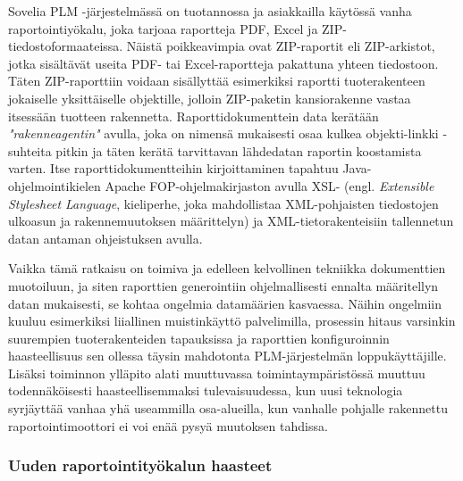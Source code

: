 Sovelia PLM -järjestelmässä on tuotannossa ja asiakkailla käytössä vanha raportointiyökalu, joka tarjoaa raportteja PDF, Excel ja ZIP-tiedostoformaateissa. Näistä poikkeavimpia ovat ZIP-raportit eli ZIP-arkistot,  jotka sisältävät useita PDF- tai Excel-raportteja pakattuna yhteen tiedostoon. Täten ZIP-raporttiin voidaan sisällyttää esimerkiksi raportti tuoterakenteen jokaiselle yksittäiselle objektille, jolloin ZIP-paketin kansiorakenne vastaa itsessään tuotteen rakennetta. Raporttidokumenttein data kerätään \textit{"rakenneagentin"} avulla, joka on nimensä mukaisesti osaa kulkea objekti-linkki -suhteita pitkin ja täten kerätä tarvittavan lähdedatan raportin koostamista varten. Itse raporttidokumentteihin kirjoittaminen tapahtuu Java-ohjelmointikielen Apache FOP-ohjelmakirjaston \cite{noauthor_apachetm_nodate} avulla XSL- (engl. \textit{Extensible Stylesheet Language}, kieliperhe, joka mahdollistaa XML-pohjaisten tiedostojen ulkoasun ja rakennemuutoksen määrittelyn) ja XML-tietorakenteisiin tallennetun datan antaman ohjeistuksen avulla.

Vaikka tämä ratkaisu on toimiva ja edelleen kelvollinen tekniikka dokumenttien muotoiluun, ja siten raporttien generointiin ohjelmallisesti ennalta määritellyn datan mukaisesti, se kohtaa ongelmia datamäärien kasvaessa. Näihin ongelmiin kuuluu esimerkiksi liiallinen muistinkäyttö palvelimilla, prosessin hitaus varsinkin suurempien tuoterakenteiden tapauksissa ja raporttien konfiguroinnin haasteellisuus sen ollessa täysin mahdotonta PLM-järjestelmän loppukäyttäjille. Lisäksi toiminnon ylläpito alati muuttuvassa toimintaympäristössä muuttuu todennäköisesti haasteellisemmaksi tulevaisuudessa, kun uusi teknologia syrjäyttää vanhaa yhä useammilla osa-alueilla, kun vanhalle pohjalle rakennettu raportointimoottori ei voi enää pysyä muutoksen tahdissa.

\subsubsection{Uuden raportointityökalun haasteet}

